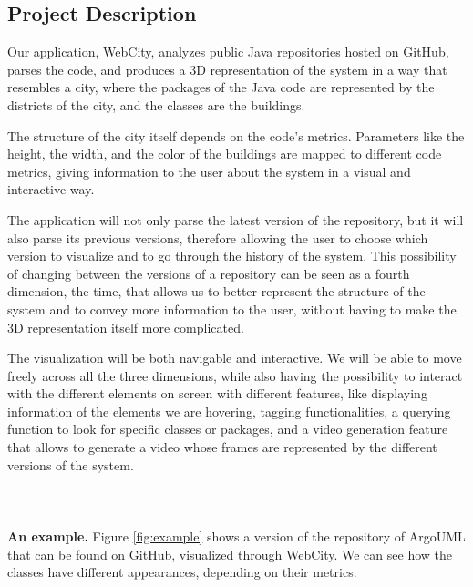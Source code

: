\documentclass[]{usiinfbachelorproject}
\begin{document}
\subsection{Project Description} \label{Project Description}
Our application, WebCity, analyzes public Java repositories hosted on GitHub, parses the code, and produces a 3D representation of the system in a way that resembles a city, where the packages of the Java code are represented by the districts of the city, and the classes are the buildings.

The structure of the city itself depends on the code's metrics. Parameters like the height, the width, and the color of the buildings are mapped to different code metrics, giving information to the user about the system in a visual and interactive way.

The application will not only parse the latest version of the repository, but it will also parse its previous versions, therefore allowing the user to choose which version to visualize and to go through the history of the system. This possibility of changing between the versions of a repository can be seen as a fourth dimension, the time, that allows us to better represent the structure of the system and to convey more information to the user, without having to make the 3D representation itself more complicated.

The visualization will be both navigable and interactive. We will be able to move freely across all the three dimensions, while also having the possibility to interact with the different elements on screen with different features, like displaying information of the elements we are hovering, tagging functionalities, a querying function to look for specific classes or packages, and a video generation feature that allows to generate a video whose frames are represented by the different versions of the system.\\\\\\\\

\textbf{An example.} Figure \ref{fig:example} shows a version of the repository of ArgoUML that can be found on GitHub, visualized through WebCity. We can see how the classes have different appearances, depending on their metrics.
\end{document}
